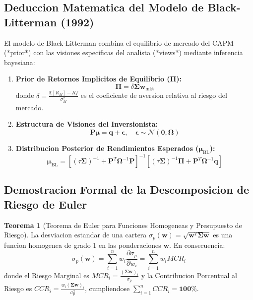 \documentclass[10pt,a4paper]{article}
\theoremstyle{definition}
\newtheorem{teorema}{\color{primary}\textbf{Teorema}}[section]
\begin{document}
\subsection{Deduccion Matematica del Modelo de Black-Litterman (1992)}
El modelo de Black-Litterman combina el equilibrio de mercado del CAPM (*prior*) con las visiones especificas del analista (*views*) mediante inferencia bayesiana:
\begin{enumerate}
    \item \textbf{Prior de Retornos Implicitos de Equilibrio ($\boldsymbol{\Pi}$):}
    \begin{equation}
    \boldsymbol{\Pi} = \delta \mathbf{\Sigma} \mathbf{w}_{\text{mkt}}
    \end{equation}
    donde $\delta = \frac{\mathbb{E}[R_M] - Rf}{\sigma_M^2}$ es el coeficiente de aversion relativa al riesgo del mercado.
    \item \textbf{Estructura de Visiones del Inversionista:}
    \begin{equation}
    \mathbf{P} \boldsymbol{\mu} = \mathbf{q} + \boldsymbol{\epsilon}, \quad \boldsymbol{\epsilon} \sim \mathcal{N}(\mathbf{0}, \mathbf{\Omega})
    \end{equation}
    \item \textbf{Distribucion Posterior de Rendimientos Esperados ($\boldsymbol{\mu}_{\text{BL}}$):}
    \begin{equation}
    \boldsymbol{\mu}_{\text{BL}} = \left[ (\tau \mathbf{\Sigma})^{-1} + \mathbf{P}^T \mathbf{\Omega}^{-1} \mathbf{P} \right]^{-1} \left[ (\tau \mathbf{\Sigma})^{-1} \boldsymbol{\Pi} + \mathbf{P}^T \mathbf{\Omega}^{-1} \mathbf{q} \right]
    \end{equation}
\end{enumerate}

\subsection{Demostracion Formal de la Descomposicion de Riesgo de Euler}

\begin{teorema}[Teorema de Euler para Funciones Homogeneas y Presupuesto de Riesgo]
La desviacion estandar de una cartera $\sigma_p(\mathbf{w}) = \sqrt{\mathbf{w}^T \mathbf{\Sigma} \mathbf{w}}$ es una funcion homogenea de grado 1 en las ponderaciones $\mathbf{w}$. En consecuencia:
\begin{equation}
\sigma_p(\mathbf{w}) = \sum_{i=1}^n w_i \frac{\partial \sigma_p}{\partial w_i} = \sum_{i=1}^n w_i MCR_i
\end{equation}
donde el Riesgo Marginal es $MCR_i = \frac{(\mathbf{\Sigma} \mathbf{w})_i}{\sigma_p}$ y la Contribucion Porcentual al Riesgo es $CCR_i = \frac{w_i (\mathbf{\Sigma} \mathbf{w})_i}{\sigma_p^2}$, cumpliendose $\sum_{i=1}^n CCR_i = \textbf{100\%}$.
\end{teorema}
\end{document}
